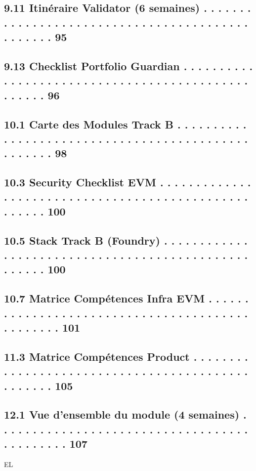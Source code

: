 \documentclass[12pt,landscape,a4paper]{article}
\begin{document}
\subsection{9.11 Itinéraire Validator (6 semaines) . . . . . . . . . . . . . . . . . . . . . . . . . . . . . . . . . . . . . . . . . . . . . . . .    95}
\subsection{9.13 Checklist Portfolio Guardian . . . . . . . . . . . . . . . . . . . . . . . . . . . . . . . . . . . . . . . . . . . . . . . . . .     96}
\vspace{0.5em}
\subsection{10.1 Carte des Modules Track B . . . . . . . . . . . . . . . . . . . . . . . . . . . . . . . . . . . . . . . . . . . . . . . . . . . 98}
\subsection{10.3 Security Checklist EVM . . . . . . . . . . . . . . . . . . . . . . . . . . . . . . . . . . . . . . . . . . . . . . . . . . . . . 100}
\subsection{10.5 Stack Track B (Foundry) . . . . . . . . . . . . . . . . . . . . . . . . . . . . . . . . . . . . . . . . . . . . . . . . . . . . 100}
\subsection{10.7 Matrice Compétences Infra EVM . . . . . . . . . . . . . . . . . . . . . . . . . . . . . . . . . . . . . . . . . . . . . . . . 101}
\vspace{0.5em}
\subsection{11.3 Matrice Compétences Product . . . . . . . . . . . . . . . . . . . . . . . . . . . . . . . . . . . . . . . . . . . . . . . . . 105}
\vspace{0.5em}
\subsection{12.1 Vue d’ensemble du module (4 semaines) . . . . . . . . . . . . . . . . . . . . . . . . . . . . . . . . . . . . . . . . . . . . 107}
\vspace{0.5em}
\vspace{0.5em}
\vspace{0.5em}
\vspace{0.5em}
EL\\
\end{document}
